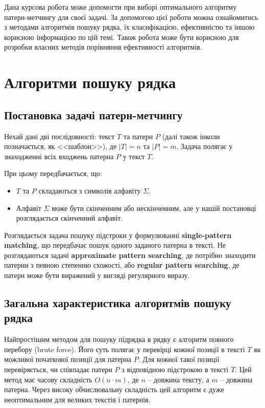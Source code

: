 \documentclass[a4paper,14pt]{extarticle} %
\begin{document}
Дана курсова робота може допомогти при виборі оптимального алгоритму патерн-метчингу для своєї задачі. За допомогою цієї роботи можна ознайомитись з методами алгоритмів пошуку рядка, їх класифікацією, ефективністю та іншою корисною інформацією по цій темі.
Також робота може бути корисною для розробки власних методів порівняння ефективності алгоритмів. 

    \newpage



    \section{Алгоритми пошуку рядка}

	\subsection{Постановка задачі патерн-метчингу}

	Нехай дані дві послідовності: текст \( T \) та патерн \( P \) (далі також інколи позначається, як <<шаблон>>), де \( |T| = n \) та \( |P| = m \). Задача полягає у знаходженні всіх входжень патерна \( P \) у текст \( T \).

При цьому передбачається, що:
\begin{itemize}
    \item \( T \) та \( P \) складаються з символів алфавіту \( \Sigma \).
    \item Алфавіт \( \Sigma \) може бути скінченним або нескінченним, але у нашій постановці розглядається скінченний алфавіт.
\end{itemize}


Розглядається задача пошуку підстроки у формулюванні \textbf{single-pattern matching}, що передбачає пошук одного заданого патерна в тексті. Не розглядаються задачі \textbf{approximate pattern searching}, де потрібно знаходити патерни з певною степенню схожості, або \textbf{regular pattern searching}, де патерн може бути виражений у вигляді регулярного виразу.


	\subsection{Загальна характеристика алгоритмів пошуку рядка}

	Найпростішим методом для пошуку підрядка в рядку є алгоритм повного перебору (brute force). Його суть полягає у перевірці кожної позиції в тексті \( T \) як можливої початкової позиції для патерна \( P \). Для кожної такої позиції перевіряється, чи співпадає патерн \( P \) з відповідною підстрокою в тексті \( T \). Цей метод має часову складність \( O(n \cdot m) \), де \( n \) – довжина тексту, а \( m \) – довжина патерна. Через високу обчислювальну складність цей алгоритм є дуже неоптимальним для великих текстів і патернів.
\end{document}
